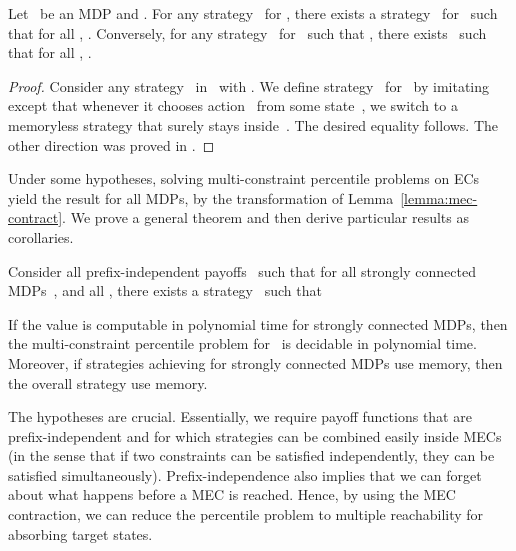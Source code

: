 \documentclass{llncs}
\begin{document}
\begin{lemma}
  \label{lemma:mec-contract}
	Let~ be an MDP and . For any strategy~ for , there exists a strategy~ for~ such that
  for all , . 
  Conversely, for any strategy~ for~ such that , there exists~
  such that for all
  , . 
\end{lemma}

\begin{proof}
  Consider any strategy~ in~ with .
  We define strategy~ for~ by imitating~ except that whenever it chooses action~ from some state~, we switch 
  to a memoryless strategy that surely stays inside~. The desired equality follows. The other direction was proved in \cite[Lemma 4.6]{BBCFK-lmcs14}.
\end{proof}

Under some hypotheses, solving multi-constraint percentile problems on ECs
yield the result for all MDPs, by  the transformation of Lemma~\ref{lemma:mec-contract}.
We prove a general theorem and then derive particular results as corollaries.

\begin{theorem}
  \label{thm:general}
  Consider all prefix-independent payoffs~ such that for all strongly connected MDPs~, 
  and all , 
there exists a strategy~ such that
  
  If the value  is computable in polynomial time for strongly connected MDPs, then the multi-constraint percentile problem for~ is decidable in polynomial time.
  Moreover, if strategies achieving  for strongly connected MDPs use  memory,
  then the overall strategy use  memory.
\end{theorem}


The hypotheses are crucial. Essentially, we require payoff functions that are prefix-independent and for which strategies can be combined easily inside MECs (in the sense that if two constraints can be satisfied independently, they can be satisfied simultaneously). Prefix-independence also implies that we can forget about what happens before a MEC is reached. Hence, by using the MEC contraction, we can reduce the percentile problem to multiple reachability for absorbing target states.
\end{document}
